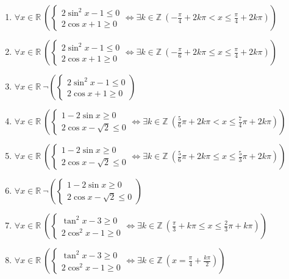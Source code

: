 \documentclass[11pt,a4paper]{article}
\begin{document}
\begin{enumerate}
\item $\displaystyle \forall x \in \mathbb{R}\ \left( \begin{cases} 2\sin^{2} x - 1 \le 0 \\ 2\cos x + 1 \ge 0 \end{cases} \iff \exists k \in \mathbb{Z}\ \left( -\frac{\pi}{4} + 2k\pi < x \le \frac{\pi}{4} + 2k\pi \right) \right)$
\item $\displaystyle \forall x \in \mathbb{R}\ \left( \begin{cases} 2\sin^{2} x - 1 \le 0 \\ 2\cos x + 1 \ge 0 \end{cases} \iff \exists k \in \mathbb{Z}\ \left( -\frac{\pi}{6} + 2k\pi \le x \le \frac{\pi}{4} + 2k\pi \right) \right)$
\item $\displaystyle \forall x \in \mathbb{R}\ \lnot \left( \begin{cases} 2\sin^{2} x - 1 \le 0 \\ 2\cos x + 1 \ge 0 \end{cases} \right)$
\item $\displaystyle \forall x \in \mathbb{R}\ \left( \begin{cases} 1 - 2\sin x \ge 0 \\ 2\cos x - \sqrt{2} \le 0 \end{cases} \iff \exists k \in \mathbb{Z}\ \left( \frac{5}{6}\pi + 2k\pi < x \le \frac{7}{4}\pi + 2k\pi \right) \right)$
\item $\displaystyle \forall x \in \mathbb{R}\ \left( \begin{cases} 1 - 2\sin x \ge 0 \\ 2\cos x - \sqrt{2} \le 0 \end{cases} \iff \exists k \in \mathbb{Z}\ \left( \frac{5}{6}\pi + 2k\pi \le x \le \frac{5}{3}\pi + 2k\pi \right) \right)$
\item $\displaystyle \forall x \in \mathbb{R}\ \lnot \left( \begin{cases} 1 - 2\sin x \ge 0 \\ 2\cos x - \sqrt{2} \le 0 \end{cases} \right)$
\item $\displaystyle \forall x \in \mathbb{R}\ \left( \begin{cases} \tan^{2} x - 3 \ge 0 \\ 2\cos^{2} x - 1 \ge 0 \end{cases} \iff \exists k \in \mathbb{Z}\ \left( \frac{\pi}{3} + k\pi \le x \le \frac{2}{3}\pi + k\pi \right) \right)$
\item $\displaystyle \forall x \in \mathbb{R}\ \left( \begin{cases} \tan^{2} x - 3 \ge 0 \\ 2\cos^{2} x - 1 \ge 0 \end{cases} \iff \exists k \in \mathbb{Z}\ \left( x = \frac{\pi}{4} + \frac{k\pi}{2} \right) \right)$

\end{enumerate}
\end{document}
